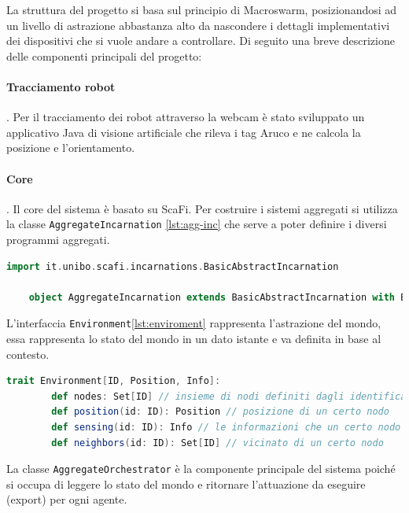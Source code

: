 \documentclass[12pt,a4paper,openright,twoside]{book}
\begin{document}
La struttura del progetto si basa sul principio di Macroswarm, posizionandosi ad un livello di astrazione abbastanza alto da nascondere i dettagli implementativi dei dispositivi che si vuole andare a controllare. Di seguito una breve descrizione delle componenti principali del progetto:

\paragraph{Tracciamento robot}.
Per il tracciamento dei robot attraverso la webcam è stato sviluppato un applicativo Java di visione artificiale che rileva i tag Aruco e ne calcola la posizione e l'orientamento.

\paragraph{Core}. 
Il core del sistema è basato su ScaFi.
Per costruire i sistemi aggregati si utilizza la classe \verb|AggregateIncarnation| \cref{lst:agg-inc} che serve a poter definire i diversi programmi aggregati.

\begin{lstlisting}[language=Scala, label={lst:agg-inc}, caption={Classe AggregateIncarnation}]
    import it.unibo.scafi.incarnations.BasicAbstractIncarnation

    object AggregateIncarnation extends BasicAbstractIncarnation with BuildingBlocks
\end{lstlisting}

L'interfaccia \verb|Environment|\cref{lst:enviroment} rappresenta l'astrazione del mondo, essa rappresenta lo stato del mondo in un dato istante e va definita in base al contesto.

\begin{lstlisting}[language=Scala, label={lst:enviroment}, caption={Interfaccia Enviroment}]
    trait Environment[ID, Position, Info]:
        def nodes: Set[ID] // insieme di nodi definiti dagli identificatori ID
        def position(id: ID): Position // posizione di un certo nodo
        def sensing(id: ID): Info // le informazioni che un certo nodo espone
        def neighbors(id: ID): Set[ID] // vicinato di un certo nodo
\end{lstlisting}

La classe \verb|AggregateOrchestrator| è la componente principale del sistema poiché si occupa di leggere lo stato del mondo e ritornare l'attuazione da eseguire (export) per ogni agente.
\end{document}
